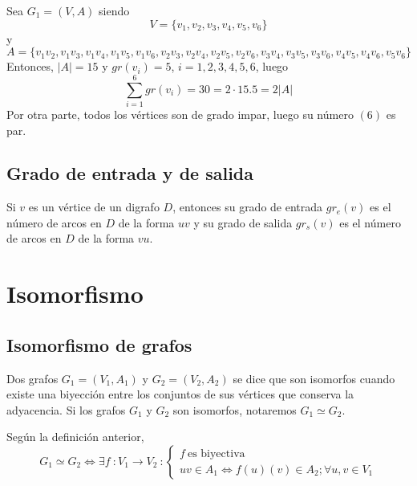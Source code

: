 Sea $G_1 = (V,A)$ siendo\\
\[ V = \{v_1,v_2,v_3,v_4,v_5,v_6\} \]
y\\
\[ A = \{v_1v_2,v_1v_3,v_1v_4,v_1v_5,v_1v_6,v_2v_3,v_2v_4,v_2v_5,v_2v_6,v_3v_4,v_3v_5,v_3v_6,v_4v_5,v_4v_6,v_5v_6\} \]
Entonces, $|A| = 15$ y $gr(v_i) = 5$, $i = 1,2,3,4,5,6$, luego
\[  \sum^{6}_{i=1}{gr(v_i) = 30 = 2 \cdot 15.5 = 2 |A|} \]
Por otra parte, todos los vértices son de grado impar, luego su número $(6)$ es par.\\

\subsection{Grado de entrada y de salida}

\begin{fondo}
Si $v$ es un vértice de un digrafo $D$, entonces su grado de entrada $gr_e(v)$ es el número de arcos en $D$ de la forma $uv$ y su grado de salida $gr_s(v)$ es el número de arcos en $D$ de la forma $vu$.
\end{fondo}

\section{Isomorfismo}

\subsection{Isomorfismo de grafos}

\begin{fondo}
Dos grafos $G_1 = (V_1,A_1)$ y $G_2 = (V_2,A_2)$ se dice que son isomorfos cuando existe una biyección entre los conjuntos de sus vértices que conserva la adyacencia. Si los grafos $G_1$ y $G_2$ son isomorfos, notaremos $G_1 \simeq G_2$.
\end{fondo}

Según la definición anterior,\\
\[ G_1 \simeq G_2 \iff \exists f\ : V_1 \rightarrow V_2\ : 
\left\{ 
  \begin{array}{l} 
    f\ \mbox{es biyectiva}  \\ 
    uv \in A_1 \iff f(u)(v) \in A_2; \forall u,v \in V_1
  \end{array} 
\right. \]

